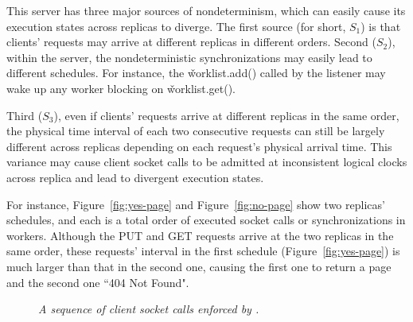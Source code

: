 This server has three major sources of nondeterminism, 
which can easily cause its execution states across 
replicas to diverge. The first source (for short, $S_1$) is that clients' 
requests may arrive at different replicas in different orders. Second ($S_2$), 
within the server, the nondeterministic \pthread synchronizations may easily 
lead to different schedules. For instance, the \v{worklist.add()} called by 
the listener may wake up any worker blocking on \v{worklist.get()}.

Third ($S_3$), even if clients' requests arrive at different replicas in the 
same order, the physical time interval of each two consecutive requests can 
still be largely different across replicas depending on each request's physical 
arrival time. This variance may cause client socket calls to be 
admitted at inconsistent logical clocks across replica and lead to divergent 
execution states.

For instance, Figure~\ref{fig:yes-page} and Figure~\ref{fig:no-page} show two 
replicas' schedules, and each is a total order of executed socket calls or 
\pthread synchronizations in workers. Although the PUT and 
GET requests arrive at the two replicas in the same order, these requests' 
interval in the first schedule (Figure~\ref{fig:yes-page}) is much larger than 
that in the second one, causing the first one to return a page and the second 
one ``404 Not Found".



\begin{figure}[t]
\centering
{}
\vspace{-.2in}
\caption{{\em A sequence of client socket calls enforced by 
\xxx.}}\label{fig:paxos-queue}
\vspace{-.25in}
\end{figure}

